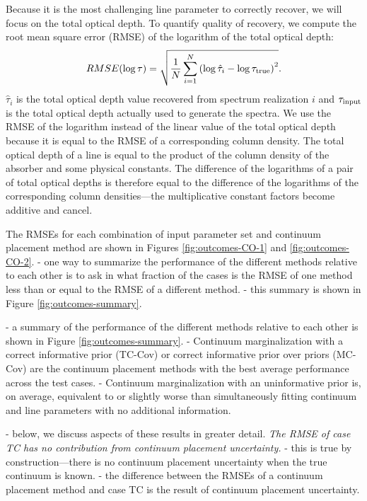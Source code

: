 \documentclass[trackchanges]{aastex62}
\begin{document}
{Because it is the most challenging line parameter to correctly recover, we will focus on the total optical depth.
To quantify quality of recovery, we compute the root mean square error (RMSE) of the logarithm of the total optical depth:
\begin{equation}
  \label{eqn:RMSE-def}
  RMSE(\log\tau) = \sqrt{
    \frac{1}{N} \sum_{i=1}^{N} \left( \log\hat{\tau}_i - \log\tau_{\rm true} \right)^2
  }.
\end{equation}
$\hat{\tau}_i$ is the total optical depth value recovered from spectrum realization $i$ and $\tau_{\rm input}$ is the total optical depth actually used to generate the spectra.
We use the RMSE of the logarithm instead of the linear value of the total optical depth because it is equal to the RMSE of a corresponding column density.
The total optical depth of a line is equal to the product of the column density of the absorber and some physical constants.
The difference of the logarithms of a pair of total optical depths is therefore equal to the difference of the logarithms of the corresponding column densities---the multiplicative constant factors become additive and cancel.

The RMSEs for each combination of input parameter set and continuum placement method are shown in Figures \ref{fig:outcomes-CO-1} and \ref{fig:outcomes-CO-2}.
- one way to summarize the performance of the different methods relative to each other is to ask in what fraction of the cases is the RMSE of one method less than or equal to the RMSE of a different method.
- this summary is shown in Figure \ref{fig:outcomes-summary}.

- a summary of the performance of the different methods relative to each other is shown in Figure \ref{fig:outcomes-summary}.
- Continuum marginalization with a correct informative prior (TC-Cov) or correct informative prior over priors (MC-Cov) are the continuum placement methods with the best average performance across the test cases.
- Continuum marginalization with an uninformative prior is, on average, equivalent to or slightly worse than simultaneously fitting continuum and line parameters with no additional information.

- below, we discuss aspects of these results in greater detail.
\emph{The RMSE of case TC has no contribution from continuum placement uncertainty.}
- this is true by construction---there is no continuum placement uncertainty when the true continuum is known.
- the difference between the RMSEs of a continuum placement method and case TC is the result of continuum placement uncertainty.

}
\end{document}
